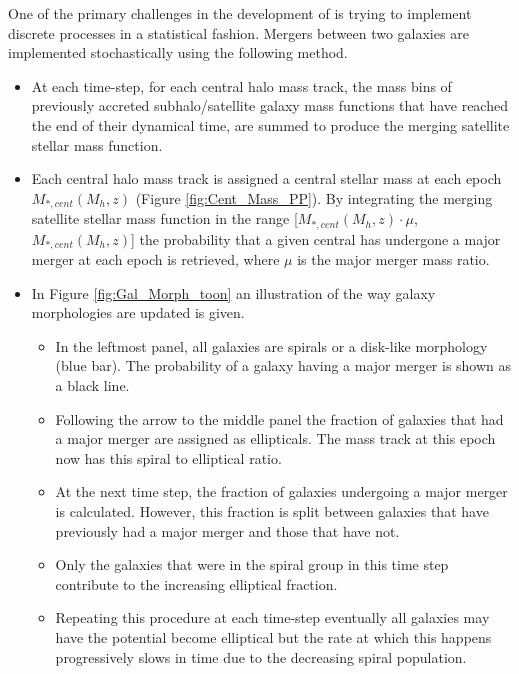 One of the primary challenges in the development of \steel is trying to implement discrete processes in a statistical fashion. Mergers between two galaxies are implemented stochastically using the following method.
\begin{itemize}
    \item At each time-step, for each central halo mass track, the mass bins of previously accreted subhalo/satellite galaxy mass functions that have reached the end of their dynamical time, are summed to produce the merging satellite stellar mass function. 
    \item Each central halo mass track is assigned a central stellar mass at each epoch $M_{*,cent}(M_{h}, z)$ (Figure \ref{fig:Cent_Mass_PP}). By integrating the merging satellite stellar mass function in the range [$M_{*,cent}(M_{h}, z) \cdot \mu$, $M_{*,cent}(M_{h}, z)$] the probability that a given central has undergone a major merger at each epoch is retrieved, where $\mu$ is the major merger mass ratio. 
    \item In Figure \ref{fig:Gal_Morph_toon} an illustration of the way galaxy morphologies are updated is given. 
    \begin{itemize}
        \item In the leftmost panel, all galaxies are spirals or a disk-like morphology (blue bar). The probability of a galaxy having a major merger is shown as a black line.
        \item Following the arrow to the middle panel the fraction of galaxies that had a major merger are assigned as ellipticals. The mass track at this epoch now has this spiral to elliptical ratio.
        \item At the next time step, the fraction of galaxies undergoing a major merger is calculated. However, this fraction is split between galaxies that have previously had a major merger and those that have not. 
        \item Only the galaxies that were in the spiral group in this time step contribute to the increasing elliptical fraction.
        \item Repeating this procedure at each time-step eventually all galaxies may have the potential become elliptical but the rate at which this happens progressively slows in time due to the decreasing spiral population.
    \end{itemize}
\end{itemize}

